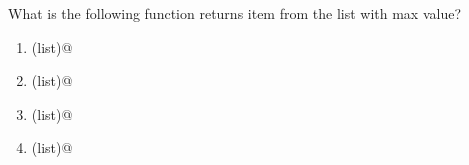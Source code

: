 \question
What is the following function returns item from the list with max value?

\begin{enumerate}
\item \lstinline@cmp(list)@
\item \lstinline@len(list)@
\item \lstinline@max(list)@
\item \lstinline@min(list)@
\end{enumerate}

